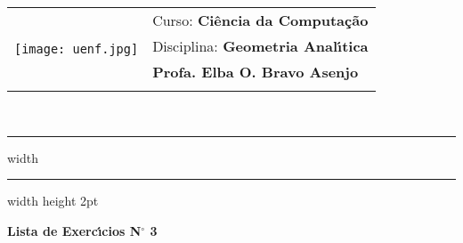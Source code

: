 \documentclass[12pt]{article}
\begin{document}
\begin{tabular}{cl}
  \multirow{4}{*}{
    \texttt{[image: uenf.jpg]} }
   & Curso: \textbf{Ci\^{e}ncia da Computa\c{c}\~{a}o} \\
   & Disciplina: \textbf{Geometria Anal\'{\i}tica}     \\
   & \textbf{Profa. Elba O. Bravo Asenjo}              \\
   & \DiaMesAno{\today}                                \\
\end{tabular}\\

\hrule width \hsize \kern 1mm \hrule width \hsize height 2pt



\begin{center}
  \huge\bf Lista de Exerc\'{\i}cios N$^{\circ}$ 3
\end{center}
\end{document}
